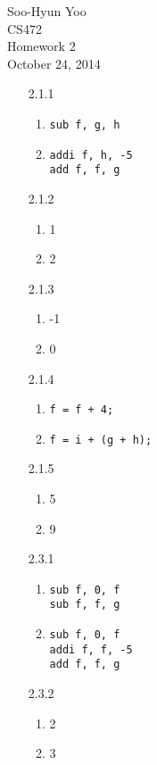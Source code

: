 \documentclass[12pt,letterpaper]{article}
\begin{document}
Soo-Hyun Yoo \\
CS472 \\
Homework 2 \\
October 24, 2014

\begin{enumerate}
	\item[2.1.1]
		\begin{enumerate}
			\item {\tt sub f, g, h}
			\item {\tt addi f, h, -5 \\ add f, f, g}
		\end{enumerate}

	\item[2.1.2]
		\begin{enumerate}
			\item 1
			\item 2
		\end{enumerate}

	\item[2.1.3]
		\begin{enumerate}
			\item -1
			\item 0
		\end{enumerate}

	\item[2.1.4]
		\begin{enumerate}
			\item {\tt f = f + 4;}
			\item {\tt f = i + (g + h);}
		\end{enumerate}

	\item[2.1.5]
		\begin{enumerate}
			\item 5
			\item 9
		\end{enumerate}

	\item[2.3.1]
		\begin{enumerate}
			\item {\tt sub f, 0, f \\ sub f, f, g}
			\item {\tt sub f, 0, f \\ addi f, f, -5 \\ add f, f, g}
		\end{enumerate}

	\item[2.3.2]
		\begin{enumerate}
			\item 2
			\item 3
		\end{enumerate}


\end{enumerate}
\end{document}
